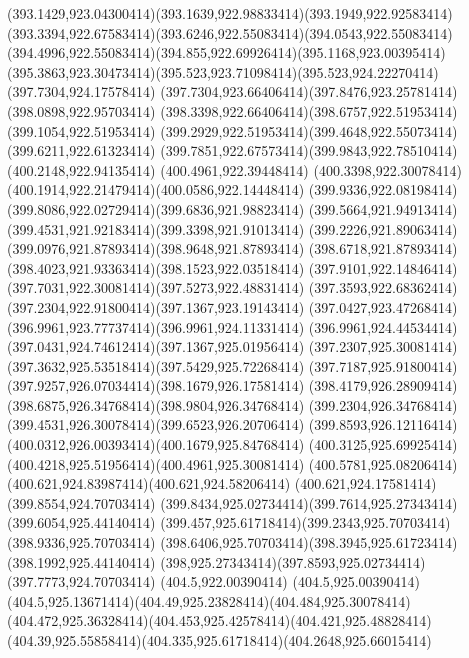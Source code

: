 {{	\curveto(393.1429,923.04300414)(393.1639,922.98833414)(393.1949,922.92583414)
	\curveto(393.3394,922.67583414)(393.6246,922.55083414)(394.0543,922.55083414)
	\curveto(394.4996,922.55083414)(394.855,922.69926414)(395.1168,923.00395414)
	\curveto(395.3863,923.30473414)(395.523,923.71098414)(395.523,924.22270414)
	\closepath
	\moveto(397.7304,924.17578414)
	\curveto(397.7304,923.66406414)(397.8476,923.25781414)(398.0898,922.95703414)
	\curveto(398.3398,922.66406414)(398.6757,922.51953414)(399.1054,922.51953414)
	\curveto(399.2929,922.51953414)(399.4648,922.55073414)(399.6211,922.61323414)
	\curveto(399.7851,922.67573414)(399.9843,922.78510414)(400.2148,922.94135414)
	\lineto(400.4961,922.39448414)
	\curveto(400.3398,922.30078414)(400.1914,922.21479414)(400.0586,922.14448414)
	\curveto(399.9336,922.08198414)(399.8086,922.02729414)(399.6836,921.98823414)
	\curveto(399.5664,921.94913414)(399.4531,921.92183414)(399.3398,921.91013414)
	\curveto(399.2226,921.89063414)(399.0976,921.87893414)(398.9648,921.87893414)
	\curveto(398.6718,921.87893414)(398.4023,921.93363414)(398.1523,922.03518414)
	\curveto(397.9101,922.14846414)(397.7031,922.30081414)(397.5273,922.48831414)
	\curveto(397.3593,922.68362414)(397.2304,922.91800414)(397.1367,923.19143414)
	\curveto(397.0427,923.47268414)(396.9961,923.77737414)(396.9961,924.11331414)
	\curveto(396.9961,924.44534414)(397.0431,924.74612414)(397.1367,925.01956414)
	\curveto(397.2307,925.30081414)(397.3632,925.53518414)(397.5429,925.72268414)
	\curveto(397.7187,925.91800414)(397.9257,926.07034414)(398.1679,926.17581414)
	\curveto(398.4179,926.28909414)(398.6875,926.34768414)(398.9804,926.34768414)
	\curveto(399.2304,926.34768414)(399.4531,926.30078414)(399.6523,926.20706414)
	\curveto(399.8593,926.12116414)(400.0312,926.00393414)(400.1679,925.84768414)
	\curveto(400.3125,925.69925414)(400.4218,925.51956414)(400.4961,925.30081414)
	\curveto(400.5781,925.08206414)(400.621,924.83987414)(400.621,924.58206414)
	\lineto(400.621,924.17581414)
	\closepath
	\moveto(399.8554,924.70703414)
	\curveto(399.8434,925.02734414)(399.7614,925.27343414)(399.6054,925.44140414)
	\curveto(399.457,925.61718414)(399.2343,925.70703414)(398.9336,925.70703414)
	\curveto(398.6406,925.70703414)(398.3945,925.61723414)(398.1992,925.44140414)
	\curveto(398,925.27343414)(397.8593,925.02734414)(397.7773,924.70703414)
	\closepath
	\moveto(404.5,922.00390414)
	\lineto(404.5,925.00390414)
	\curveto(404.5,925.13671414)(404.49,925.23828414)(404.484,925.30078414)
	\curveto(404.472,925.36328414)(404.453,925.42578414)(404.421,925.48828414)
	\curveto(404.39,925.55858414)(404.335,925.61718414)(404.2648,925.66015414)
}}
